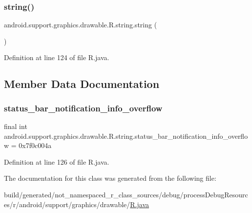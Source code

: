 \subsubsection{\texorpdfstring{string()}{string()}}
{\footnotesize\ttfamily android.\+support.\+graphics.\+drawable.\+R.\+string.\+string (\begin{DoxyParamCaption}{ }\end{DoxyParamCaption})\hspace{0.3cm}{\ttfamily [private]}}



Definition at line 124 of file R.\+java.


\begin{DoxyCode}{0}

\end{DoxyCode}


\subsection{Member Data Documentation}
\mbox{\label{classandroid_1_1support_1_1graphics_1_1drawable_1_1_r_1_1string_afa1adb5f8eacaefd685b9cfa844e77de}} 
\subsubsection{\texorpdfstring{status\_bar\_notification\_info\_overflow}{status\_bar\_notification\_info\_overflow}}
{\footnotesize\ttfamily final int android.\+support.\+graphics.\+drawable.\+R.\+string.\+status\+\_\+bar\+\_\+notification\+\_\+info\+\_\+overflow = 0x7f0c004a\hspace{0.3cm}{\ttfamily [static]}}



Definition at line 126 of file R.\+java.



The documentation for this class was generated from the following file\+:\begin{DoxyCompactItemize}
\item 
build/generated/not\+\_\+namespaced\+\_\+r\+\_\+class\+\_\+sources/debug/process\+Debug\+Resources/r/android/support/graphics/drawable/\mbox{\hyperlink{android_2support_2graphics_2drawable_2_r_8java}{R.\+java}}\end{DoxyCompactItemize}
